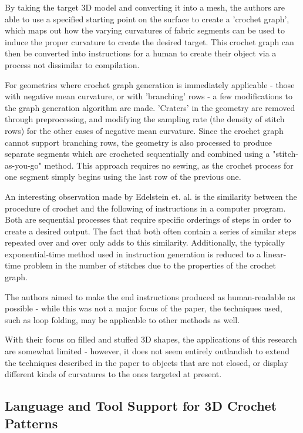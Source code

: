 \documentclass{IEEEcsmag}
\begin{document}
By taking the target 3D model and converting it into a mesh, the authors are able to use a specified starting point on the surface to create a 'crochet graph', which maps out how the varying curvatures of fabric segments can be used to induce the proper curvature to create the desired target. This crochet graph can then be converted into instructions for a human to create their object via a process not dissimilar to compilation. 

For geometries where crochet graph generation is immediately applicable - those with negative mean curvature, or with 'branching' rows - a few modifications to the graph generation algorithm are made. 'Craters' in the geometry are removed through preprocessing, and modifying the sampling rate (the density of stitch rows) for the other cases of negative mean curvature. Since the crochet graph cannot support branching rows, the geometry is also processed to produce separate segments which are crocheted sequentially and combined using a "stitch-as-you-go" method. This approach requires no sewing, as the crochet process for one segment simply begins using the last row of the previous one.

An interesting observation made by Edelstein et. al. is the similarity between the procedure of crochet and the following of instructions in a computer program. Both are sequential processes that require specific orderings of steps in order to create a desired output. The fact that both often contain a series of similar steps repeated over and over only adds to this similarity. Additionally, the typically exponential-time method used in instruction generation is reduced to a linear-time problem in the number of stitches due to the properties of the crochet graph.

The authors aimed to make the end instructions produced as human-readable as possible - while this was not a major focus of the paper, the techniques used, such as loop folding, may be applicable to other methods as well. 

With their focus on filled and stuffed 3D shapes, the applications of this research are somewhat limited - however, it does not seem entirely outlandish to extend the techniques described in the paper to objects that are not closed, or display different kinds of curvatures to the ones targeted at present. 

\subsection{Language and Tool Support for 3D Crochet Patterns}
\end{document}
